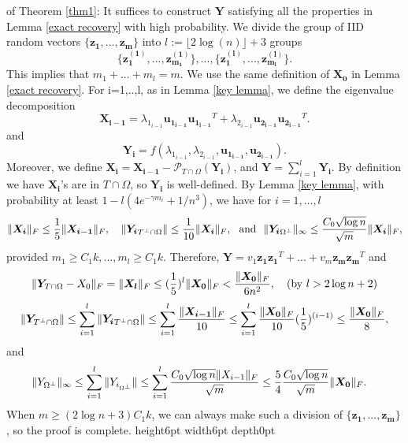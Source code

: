 \documentclass[11pt]{article}
\newcommand{\<}{\langle}
\renewcommand{\>}{\rangle}
\newcommand{\vct}[1]{\bm{#1}}
\newcommand{\mtx}[1]{\bm{#1}}
\numberwithin{equation}{section}
\def \endprf{\hfill {\vrule height6pt width6pt depth0pt}\medskip}
\newenvironment{proof}{\noindent {\bf Proof} }{\endprf\par}
\newcommand{\PTO}{\mathcal{P}_{T \cap \Omega}}
\begin{document}
\begin{proof} of Theorem \ref{thm1}: It suffices to construct $\mtx{Y}$ satisfying all the properties in Lemma \ref{exact 
recovery} with high probability. We divide the group of IID random vectors $\{\vct{z_1}, ..., \vct{z_m}\}$ into $l:=
\lfloor 
2\log(n)\rfloor+3$ groups
\[
\{\vct{z^{(1)}_1}, ..., \vct{z^{(1)}_{m_1}}\}, ..., \{\vct{z^{(l)}_1}, ..., \vct{z^{(l)}_{m_l}}\}.
\]
This implies that $m_1+...+m_l=m$. We use the same definition of $\mtx{X_0}$ in Lemma \eqref{exact recovery}. For i=1,..,l, 
as in Lemma \ref{key lemma}, we define the eigenvalue decomposition
\[
\mtx{X_{i-1}}=\lambda_{1_{i-1}}\vct{u_{1_{i-1}}}\vct{u_{1_{i-1}}}^T+\lambda_{2_{i-1}}\vct{u_{2_{i-1}}}\vct{u_{2_{i-1}}}^T.
\]
 and 
 \[
 \mtx{Y_i}=f\left(\lambda_{1_{i-1}}, \lambda_{2_{i-1}}, \vct{u_{1_{i-1}}}, \vct{u_{2_{i-1}}}\right). 
\]
 Moreover, we define $\mtx{X_i}=\mtx{X_{i-1}}-\PTO({\mtx{Y_i}})$,  and $\mtx{Y}=\sum_{i=1}^l \mtx{Y_i}$. By 
definition we have $\mtx{X_i}$'s are in $T\cap \Omega$, so $\mtx{Y_i}$ is well-defined. By Lemma 
\eqref{key lemma}, with probability at least $1-l(4e^{-\gamma m_i}+1/{n^3})$, we have for $i=1,...,l$
\[
\|\mtx{X_i}\|_F\leq{1\over 5}\|\mtx{X_{i-1}}\|_F, ~~~\|{\mtx{Y_i}}_{T^\perp\cap \Omega}\|\leq {1\over 10}\|\mtx{X_i}\|
_F, ~~\text{and}~~\|{\mtx{Y_i}}_{\Omega^{\perp}}\|_\infty\leq {{C_0\sqrt{\log n}}\over{\sqrt{m}}}\|\mtx
{X_i}\|_F,
\]
provided $m_1\geq C_1k, ..., m_l\geq C_1k$. Therefore, $\mtx{Y}=v_1\vct{z_1}\vct{z_1}^T+...+v_m\vct{z_m}\vct{z_m}^T$  
and
\[
\|\mtx{Y}_{T\cap \Omega}-X_0\|_F=\|\mtx{X_l}\|_F\leq ({1 \over 5})^l\|\mtx{X_0}\|_F<{{\|\mtx{X_0}\|_F}\over{6n^2}},~~~
(\text{by $l>2\log n+2$})
\]
\[
\|\mtx{Y}_{T^\perp \cap \Omega}\|\leq \sum_{i=1}^l\|{\mtx{Y_i}}_{T^\perp \cap \Omega}\|\leq \sum_{i=1}^l{{\|\mtx{X_
{i-1}}\|_F}\over {10}}\leq\sum_{i=1}^l{{\|\mtx{X_0}\|_F}\over {10}}({1\over 5})^{(i-1)}\leq {{\|\mtx{X_0}\|_F}
\over 
8},
\]
and
\begin{align*}
\|Y_{\Omega^{\perp}}\|_\infty   &\leq \sum_{i=1}^l\|Y_{i_{\Omega^{\perp}}}\|\leq \sum_{i=1}^l {{C_0\sqrt{\log n}\|X_
{i-1}\|_F}\over{\sqrt{m}}}\leq {5\over 4}{{C_0\sqrt{\log n}}\over{\sqrt{m}}}\|\mtx{X_0}\|_F.
\end{align*}
When $m\geq (2\log n+3)C_1k$, we can always make such a division of $\{\vct{z_1}, ..., \vct{z_m}\}$, so the proof is 
complete.
\end{proof}



\end{document}
